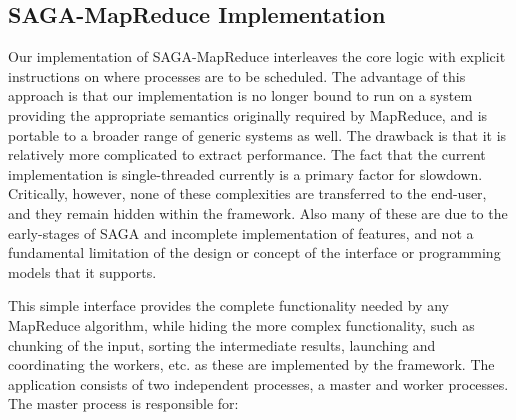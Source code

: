 \documentclass[conference,final]{IEEEtran}
\newcommand{\jhanote}[1]{ {\textcolor{red} { ***SJ: #1 }}}
\newcommand{\jhanote}[1]{}
\newcommand{\sagamapreduce }{SAGA-MapReduce }
\newcommand{\upup}{\vspace*{-0.6em}}
\begin{document}
\upup
\subsection{\sagamapreduce Implementation}
Our implementation of \sagamapreduce interleaves the core logic with
explicit instructions on where processes are to be scheduled.  The
advantage of this approach is that our implementation is no longer
bound to run on a system providing the appropriate semantics
originally required by MapReduce, and is portable to a broader range
of generic systems as well.  The drawback is that it is relatively
more complicated to extract performance.%
The fact that the current implementation is single-threaded
currently is a primary factor for slowdown.  Critically, however, none
of these complexities are transferred to the end-user, and they remain
hidden within the framework. Also many of these are due to the
early-stages of SAGA and incomplete implementation of features, and
not a fundamental limitation of the design or concept of the interface
or programming models that it supports.

This simple interface provides the complete functionality needed by
any MapReduce algorithm, while hiding the more complex functionality,
such as chunking of the input, sorting the intermediate results,
launching and coordinating the workers, etc. as these are implemented
by the framework.  The application consists of two independent
processes, a master and worker processes. The master process is
responsible for:

\end{document}
